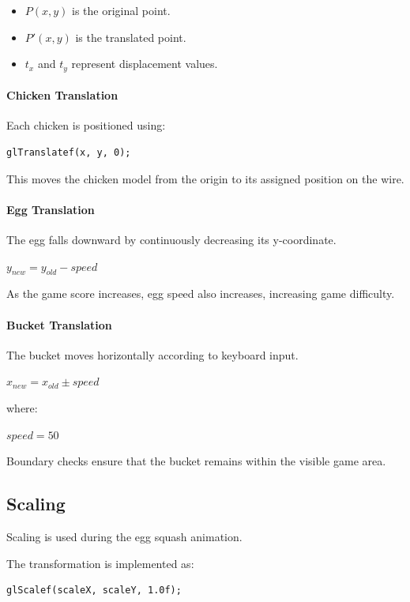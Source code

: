 \documentclass[12pt,a4paper]{report}
\begin{document}
\begin{itemize}
\item $P(x,y)$ is the original point.
\item $P'(x,y)$ is the translated point.
\item $t_x$ and $t_y$ represent displacement values.
\end{itemize}

\paragraph{Chicken Translation}

Each chicken is positioned using:

\begin{verbatim}
glTranslatef(x, y, 0);
\end{verbatim}

This moves the chicken model from the origin to its assigned position on the wire.

\paragraph{Egg Translation}

The egg falls downward by continuously decreasing its y-coordinate.


$y_{new}=y_{old}-speed$


As the game score increases, egg speed also increases, increasing game difficulty.

\paragraph{Bucket Translation}

The bucket moves horizontally according to keyboard input.


$x_{new}=x_{old}\pm speed$


where:


$speed=50$


Boundary checks ensure that the bucket remains within the visible game area.


\subsection*{Scaling}

Scaling is used during the egg squash animation.

The transformation is implemented as:

\begin{verbatim}
glScalef(scaleX, scaleY, 1.0f);
\end{verbatim}
\end{document}
